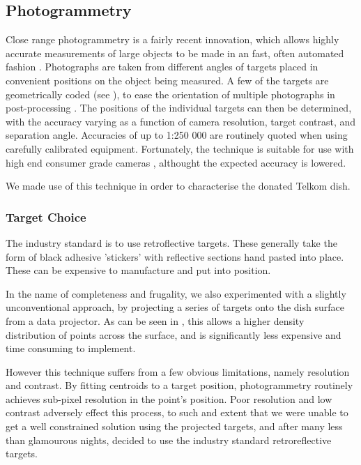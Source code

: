   \subsection{Photogrammetry}
\label{sec:photogrammetry}
Close range photogrammetry is a fairly recent innovation, which allows highly accurate measurements of large objects to be made in an fast, often automated fashion \cite{Luhmann2010}. Photographs are taken from different angles of targets placed in convenient positions on the object being measured. A few of the targets are geometrically coded (see ), to ease the orientation of multiple photographs in post-processing . The positions of the individual targets can then be determined, with the accuracy varying as a function of camera resolution, target contrast, and separation angle. Accuracies of up to 1:250 000 are routinely quoted when using carefully calibrated equipment.  Fortunately,  the technique is suitable for use with high end consumer grade cameras \cite{Deng2001}, althought the expected accuracy is lowered.

We made use of this technique in order to characterise the donated Telkom dish.

\subsubsection{Target Choice}

The industry standard is to use retroflective targets. These generally take the form of black adhesive 'stickers' with reflective sections hand pasted into place. These can be expensive to manufacture and put into position.

In the name of completeness and frugality, we also experimented with a slightly unconventional approach, by projecting a series of targets onto the dish surface from a data projector. As can be seen in , this allows a higher density distribution of points across the surface, and is significantly less expensive and time consuming to implement. 

However this technique suffers from a few obvious limitations, namely resolution and contrast. By fitting centroids to a target position, photogrammetry routinely achieves sub-pixel resolution in the point's position. Poor resolution and low contrast adversely effect this process, to such and extent that we were unable to get a well constrained solution using the projected targets, and after many less than glamourous nights, decided to use the industry standard retroreflective targets. 


